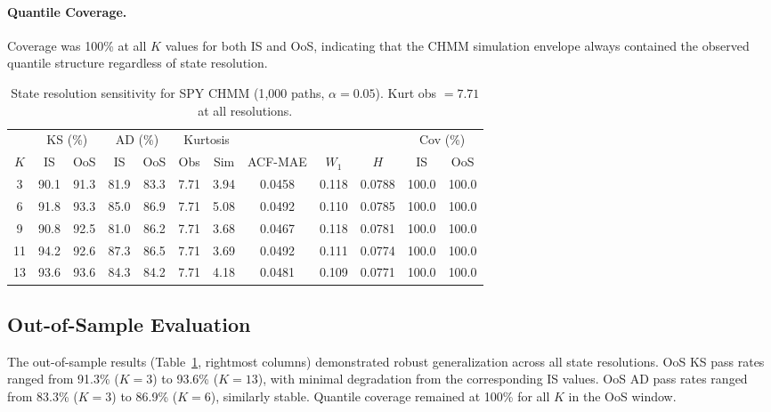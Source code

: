 \paragraph{Quantile Coverage.}
Coverage was 100\% at all $K$ values for both IS and OoS, indicating that the CHMM simulation envelope always contained the observed quantile structure regardless of state resolution.

\begin{table}[t]
\centering
\caption{State resolution sensitivity for SPY CHMM (1{,}000 paths, $\alpha = 0.05$). Kurt obs $= 7.71$ at all resolutions.}
\label{tab:sensitivity}
\small
\begin{tabular}{c cc cc cc c c c cc}
\toprule
& \multicolumn{2}{c}{KS (\%)} & \multicolumn{2}{c}{AD (\%)} & \multicolumn{2}{c}{Kurtosis} & & & & \multicolumn{2}{c}{Cov (\%)} \\
\cmidrule(lr){2-3} \cmidrule(lr){4-5} \cmidrule(lr){6-7} \cmidrule(lr){11-12}
$K$ & IS & OoS & IS & OoS & Obs & Sim & ACF-MAE & $W_1$ & $H$ & IS & OoS \\
\midrule
3  & 90.1 & 91.3 & 81.9 & 83.3 & 7.71 & 3.94 & 0.0458 & 0.118 & 0.0788 & 100.0 & 100.0 \\
6  & 91.8 & 93.3 & 85.0 & 86.9 & 7.71 & 5.08 & 0.0492 & 0.110 & 0.0785 & 100.0 & 100.0 \\
9  & 90.8 & 92.5 & 81.0 & 86.2 & 7.71 & 3.68 & 0.0467 & 0.118 & 0.0781 & 100.0 & 100.0 \\
11 & 94.2 & 92.6 & 87.3 & 86.5 & 7.71 & 3.69 & 0.0492 & 0.111 & 0.0774 & 100.0 & 100.0 \\
13 & 93.6 & 93.6 & 84.3 & 84.2 & 7.71 & 4.18 & 0.0481 & 0.109 & 0.0771 & 100.0 & 100.0 \\
\bottomrule
\end{tabular}
\end{table}

\subsection{Out-of-Sample Evaluation}
\label{sec:oos}

The out-of-sample results (Table~\ref{tab:sensitivity}, rightmost columns) demonstrated robust generalization across all state resolutions.
OoS KS pass rates ranged from 91.3\% ($K = 3$) to 93.6\% ($K = 13$), with minimal degradation from the corresponding IS values.
OoS AD pass rates ranged from 83.3\% ($K = 3$) to 86.9\% ($K = 6$), similarly stable.
Quantile coverage remained at 100\% for all $K$ in the OoS window.

